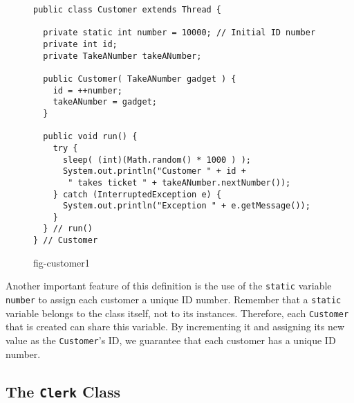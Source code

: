 \begin{figure}[h!]
\jjjprogstart
\begin{jjjlisting}
\begin{lstlisting}
public class Customer extends Thread {

  private static int number = 10000; // Initial ID number
  private int id;
  private TakeANumber takeANumber;

  public Customer( TakeANumber gadget ) {
    id = ++number;
    takeANumber = gadget;
  }

  public void run() {
    try {
      sleep( (int)(Math.random() * 1000 ) );
      System.out.println("Customer " + id + 
       " takes ticket " + takeANumber.nextNumber());
    } catch (InterruptedException e) {
      System.out.println("Exception " + e.getMessage());
    }
  } // run()
} // Customer
\end{lstlisting}
\end{jjjlisting}
{fig-customer1}
\end{figure}

Another important feature of this definition is the use of the
{\tt static} variable {\tt number} to assign each customer a unique ID
number.   Remember that a {\tt static} variable belongs to the class
itself, not to its instances.  Therefore, each {\tt Customer} that is
created can share this variable.  By incrementing it and assigning its
new value as the {\tt Customer}'s ID, we guarantee that each customer
has a unique ID number.





\subsection{The {\tt Clerk} Class}

